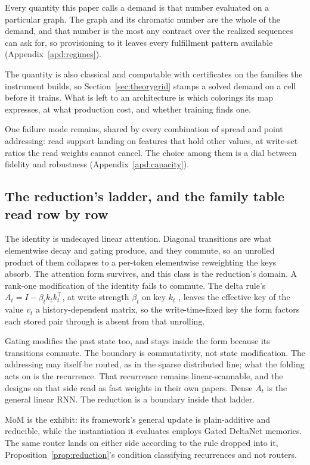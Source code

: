 Every quantity this paper calls a demand is that number evaluated on a particular graph. The graph and its chromatic number are the whole of the demand, and that number is the most any contract over the realized sequences can ask for, so provisioning to it leaves every fulfillment pattern available (Appendix~\ref{apd:regimes}).

The quantity is also classical and computable with certificates on the families the instrument builds, so Section~\ref{sec:theorygrid} stamps a solved demand on a cell before it trains. What is left to an architecture is which colorings its map expresses, at what production cost, and whether training finds one.

One failure mode remains, shared by every combination of spread and point addressing: read support landing on features that hold other values, at write-set ratios the read weights cannot cancel. The choice among them is a dial between fidelity and robustness (Appendix~\ref{apd:capacity}).

\subsection{The reduction's ladder, and the family table read row by row}
\label{apd:ladder}

The identity is undecayed linear attention. Diagonal transitions are what elementwise decay and gating produce, and they commute, so an unrolled product of them collapses to a per-token elementwise reweighting the keys absorb. The attention form survives, and this class is the reduction's domain. A rank-one modification of the identity fails to commute. The delta rule's $A_t = I - \beta_t k_t k_t^\top$, at write strength $\beta_t$ on key $k_t$ \citep{schlag2021fwp}, leaves the effective key of the value $v_t$ a history-dependent matrix, so the write-time-fixed key the form factors each stored pair through is absent from that unrolling.

Gating modifies the past state too, and stays inside the form because its transitions commute. The boundary is commutativity, not state modification. The addressing may itself be routed, as in the sparse distributed line; what the folding acts on is the recurrence. That recurrence remains linear-scannable, and the designs on that side read as fast weights in their own papers. Dense $A_t$ is the general linear RNN. The reduction is a boundary inside that ladder.

MoM is the exhibit: its framework's general update is plain-additive and reducible, while the instantiation it evaluates employs Gated DeltaNet memories. The same router lands on either side according to the rule dropped into it, Proposition~\ref{prop:reduction}'s condition classifying recurrences and not routers.

